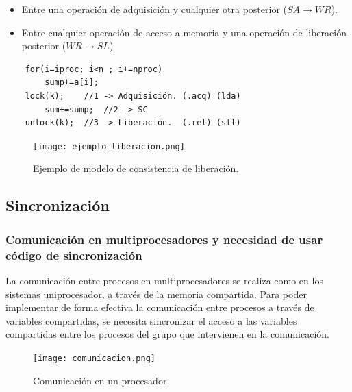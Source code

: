 \documentclass[12pt,spanish]{article}
\begin{document}
\begin{itemize}
	\item Entre una operación de adquisición y cualquier otra posterior ($SA \rightarrow WR$).
	\item Entre cualquier operación de acceso a memoria y una operación de liberación posterior ($WR \rightarrow SL$)
\end{itemize}

\begin{verbatim}
	for(i=iproc; i<n ; i+=nproc)
		sump+=a[i];
	lock(k);	//1 -> Adquisición. (.acq) (lda)
		sum+=sump;	//2 -> SC
	unlock(k);	//3 -> Liberación.	(.rel) (stl) 
\end{verbatim}
\begin{figure}[H]
\centering
\texttt{[image: ejemplo\_liberacion.png]}
\caption{Ejemplo de modelo de consistencia de liberación.}
\end{figure}


\subsection{Sincronización}


\subsubsection{Comunicación en multiprocesadores y necesidad de usar código de sincronización}

La comunicación entre procesos en multiprocesadores se realiza como en los sistemas uniprocesador, a través de la memoria compartida. Para poder implementar de forma efectiva la comunicación entre procesos a través de variables compartidas, se necesita sincronizar el acceso a las variables compartidas entre los procesos del grupo que intervienen en la comunicación.

\begin{figure}[H]
\centering
\texttt{[image: comunicacion.png]}
\caption{Comunicación en un procesador.}
\end{figure}
\end{document}
